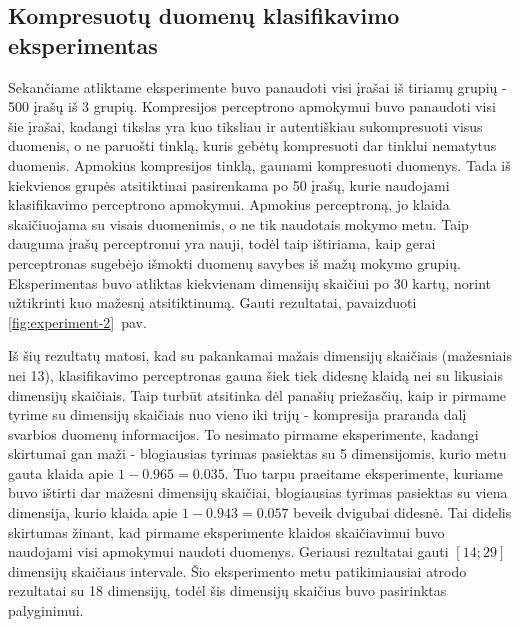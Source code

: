 \documentclass{VUMIFPSbakalaurinis}
\begin{document}
\subsection{Kompresuotų duomenų klasifikavimo eksperimentas}

Sekančiame atliktame eksperimente buvo panaudoti visi įrašai iš tiriamų grupių - 500 įrašų iš 3 grupių.
Kompresijos perceptrono apmokymui buvo panaudoti visi šie įrašai, kadangi tikslas yra kuo tiksliau ir autentiškiau sukompresuoti visus duomenis, o ne paruošti tinklą, kuris gebėtų kompresuoti dar tinklui nematytus duomenis.
Apmokius kompresijos tinklą, gaunami kompresuoti duomenys.
Tada iš kiekvienos grupės atsitiktinai pasirenkama po 50 įrašų, kurie naudojami klasifikavimo perceptrono apmokymui.
Apmokius perceptroną, jo klaida skaičiuojama su visais duomenimis, o ne tik naudotais mokymo metu.
Taip dauguma įrašų perceptronui yra nauji, todėl taip ištiriama, kaip gerai perceptronas sugebėjo išmokti duomenų savybes iš mažų mokymo grupių.
Eksperimentas buvo atliktas kiekvienam dimensijų skaičiui po 30 kartų, norint užtikrinti kuo mažesnį atsitiktinumą.
Gauti rezultatai, pavaizduoti \ref{fig:experiment-2}~pav.

Iš šių rezultatų matosi, kad su pakankamai mažais dimensijų skaičiais (mažesniais nei 13), klasifikavimo perceptronas gauna šiek tiek didesnę klaidą nei su likusiais dimensijų skaičiais.
Taip turbūt atsitinka dėl panašių priežasčių, kaip ir pirmame tyrime su dimensijų skaičiais nuo vieno iki trijų - kompresija praranda dalį svarbios duomenų informacijos.
To nesimato pirmame eksperimente, kadangi skirtumai gan maži - blogiausias tyrimas pasiektas su 5 dimensijomis, kurio metu gauta klaida apie $1 - 0.965 = 0.035$.
Tuo tarpu praeitame eksperimente, kuriame buvo ištirti dar mažesni dimensijų skaičiai, blogiausias tyrimas pasiektas su viena dimensija, kurio klaida apie $1 - 0.943 = 0.057$ beveik dvigubai didesnė.
Tai didelis skirtumas žinant, kad pirmame eksperimente klaidos skaičiavimui buvo naudojami visi apmokymui naudoti duomenys.
Geriausi rezultatai gauti $[14; 29]$ dimensijų skaičiaus intervale.
Šio eksperimento metu patikimiausiai atrodo rezultatai su 18 dimensijų, todėl šis dimensijų skaičius buvo pasirinktas palyginimui.
\end{document}
